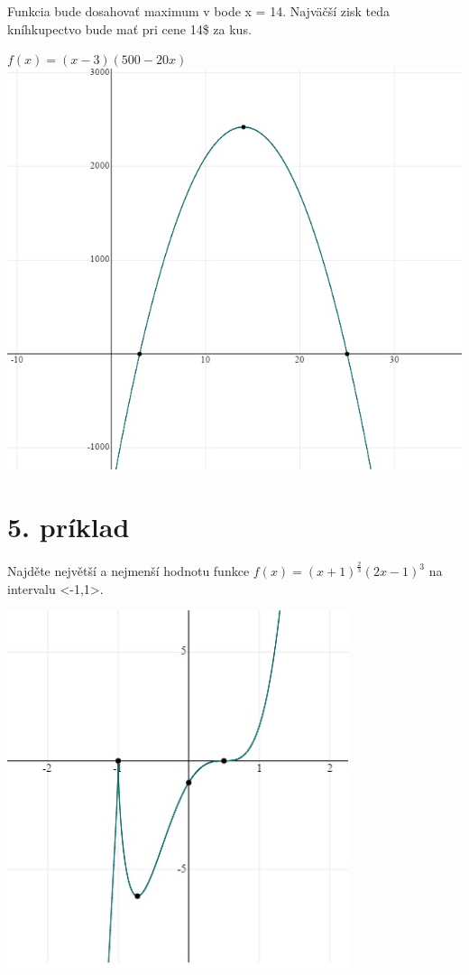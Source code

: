 \documentclass[a4paper]{article}
\begin{document}
	
	Funkcia bude dosahovať maximum v bode x = 14. Najväčší zisk teda kníhkupectvo bude mať pri cene 14\$ za kus.
	\newpage
	\begin{center}
		$f(x)  =  (x - 3)(500 - 20x)$
		\includegraphics[width=15cm]{trojka.jpg}
	\end{center}
	\newpage
	
	\section*{5. príklad}
	Najděte největší a nejmenší hodnotu funkce $f(x)=(x+1)^{\frac{2}{3}}(2x-1)^3$ na intervalu <-1,1>.
	\begin{center}
		\includegraphics[width=10cm]{petka.jpg}
	\end{center}
	
\end{document}
